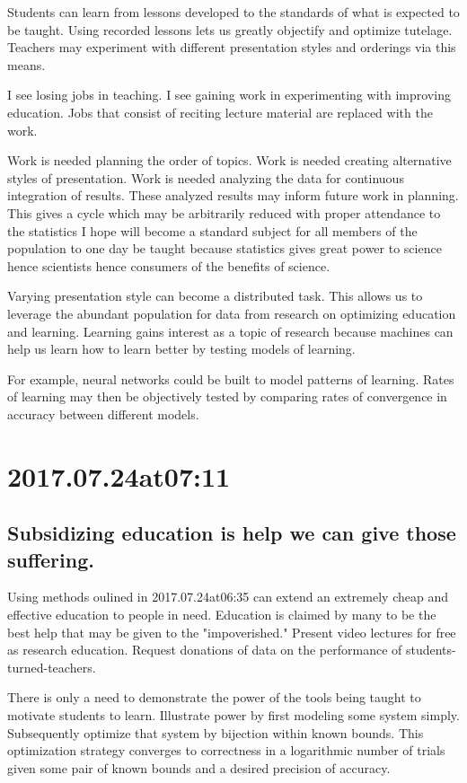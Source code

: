 Students can learn from lessons developed to the standards of what is expected to be taught. Using recorded lessons lets us greatly objectify and optimize tutelage. Teachers may experiment with different presentation styles and orderings via this means.

I see losing jobs in teaching. I see gaining work in experimenting with improving education. Jobs that consist of reciting lecture material are replaced with the work.

Work is needed planning the order of topics. Work is needed creating alternative styles of presentation. Work is needed analyzing the data for continuous integration of results. These analyzed results may inform future work in planning. This gives a cycle which may be arbitrarily reduced with proper attendance to the statistics I hope will become a standard subject for all members of the population to one day be taught because statistics gives great power to science hence scientists hence consumers of the benefits of science.

Varying presentation style can become a distributed task. This allows us to leverage the abundant population for data from research on optimizing education and learning. Learning gains interest as a topic of research because machines can help us learn how to learn better by testing models of learning.

For example, neural networks could be built to model patterns of learning. Rates of learning may then be objectively tested by comparing rates of convergence in accuracy between different models.

\section*{ 2017.07.24at07:11 }
\subsection*{ Subsidizing education is help we can give those suffering. }
Using methods oulined in 2017.07.24at06:35 can extend an extremely cheap and effective education to people in need. Education is claimed by many to be the best help that may be given to the "impoverished." Present video lectures for free as research education. Request donations of data on the performance of students-turned-teachers.

There is only a need to demonstrate the power of the tools being taught to motivate students to learn. Illustrate power by first modeling some system simply. Subsequently optimize that system by bijection within known bounds. This optimization strategy converges to correctness in a logarithmic number of trials given some pair of known bounds and a desired precision of accuracy.


